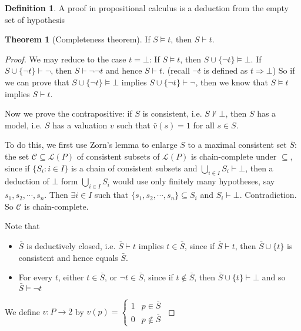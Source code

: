\documentclass[a4paper]{article}
\theoremstyle{definition}
\newtheorem*{thm}{Theorem}
\newtheorem*{defi}{Definition}
\newcommand{\La}{\mathcal{L}}
\begin{document}
\begin{defi}
  A proof in propositional calculus is a deduction from the empty set of hypothesis
\end{defi}

\begin{thm}[Completeness theorem]
  If $S\models t$, then $S\vdash t$.
\end{thm}

\begin{proof}
  We may reduce to the case $t = \bot$: If $S\models t$, then $S\cup \{\neg t\}\models \bot$.
If $S\cup\{\neg t\}\vdash \neg$, then $S\vdash \neg \neg t$ and hence $S\vdash t$. (recall $\neg t$ is defined as $t\Rightarrow \bot$) So if we can prove that $S\cup\{\neg t\}\models \bot$ implies $S\cup\{\neg t\}\vdash \neg$, then we know that $S\models t$ implies $S\vdash t$.

Now we prove the contrapositive: if $S$ is consistent, i.e. $S\not\vdash \bot$, then $S$ has a model, i.e. $S$ has a valuation $v$ such that $\bar v(s) = 1$ for all $s\in S$.

To do this, we first use Zorn's lemma to enlarge $S$ to a maximal consistent set $\bar S$: the set $\mathcal{C}\subseteq \La(P)$ of consistent subsets of $\La(P)$ is chain-complete under $\subseteq$, since if $\{S_i: i\in I\}$ is a chain of consistent subsets and $\bigcup_{i\in I}S_i\vdash \bot$, then a deduction of $\bot$ form $\bigcup_{i\in I}S_i$ would use only finitely many hypotheses, say $s_1, s_2, \cdots, s_n$. Then $\exists i\in I$ such that $\{s_1, s_2, \cdots, s_n\}\subseteq S_i$ and $S_i\vdash \bot$. Contradiction. So $\mathcal{C}$ is chain-complete.

Note that
\begin{itemize}
\item $\bar S$ is deductively closed, i.e. $\bar S\vdash t$ implies $t\in \bar S$, since if $\bar S\vdash t$, then $\bar S\cup \{t\}$ is consistent and hence equals $\bar S$.

\item For every $t$, either $t \in \bar S$, or $\neg t\in \bar S$, since if $t\not\in \bar S$, then $\bar S\cup \{t\}\vdash \bot$ and so $\bar S\models \neg t$
\end{itemize}

We define $v: P \rightarrow 2$ by $v(p)= 
\begin{cases}
  1 & p\in \bar S\\
  0 & p \not\in \bar S
\end{cases}$


\end{proof}
\end{document}
